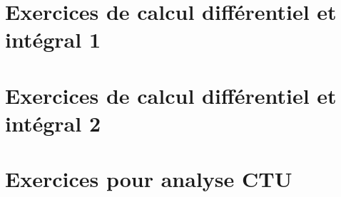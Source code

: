 \documentclass[french,a4paper]{book}
\begin{document}

\chapter{Exercices de calcul différentiel et intégral 1}



\chapter{Exercices de calcul différentiel et intégral 2}




\chapter{Exercices pour analyse CTU}


{
}



\emptyInputPath
{}

\end{document}
